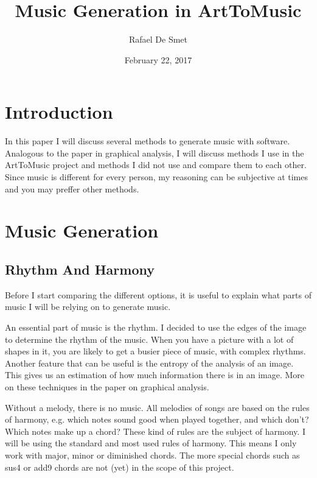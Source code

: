 \documentclass[12pt]{article}
\begin{document}
\title{Music Generation in ArtToMusic}
\date{February 22, 2017}
\author{Rafael De Smet}

\maketitle
\tableofcontents

\section{Introduction}

In this paper I will discuss several methods to generate music with software. Analogous to the paper in graphical analysis, I will discuss methods I use in the ArtToMusic project and methods I did not use and compare them to each other. Since music is different for every person, my reasoning can be subjective at times and you may preffer other methods. 

\section{Music Generation}

\subsection{Rhythm And Harmony}

Before I start comparing the different options, it is useful to explain what parts of music I will be relying on to generate music.
\newline

An essential part of music is the rhythm. I decided to use the edges of the image to determine the rhythm of the music. When you have a picture with a lot of shapes in it, you are likely to get a busier piece of music, with complex rhythms. Another feature that can be useful is the entropy of the analysis of an image. This gives us an estimation of how much information there is in an image. More on these techniques in the paper on graphical analysis.
\newline

Without a melody, there is no music. All melodies of songs are based on the rules of harmony, e.g. which notes sound good when played together, and which don't? Which notes make up a chord? These kind of rules are the subject of harmony. I will be using the standard and most used rules of harmony. This means I only work with major, minor or diminished chords. The more special chords such as sus4 or add9 chords are not (yet) in the scope of this project.
\newline
\end{document}
